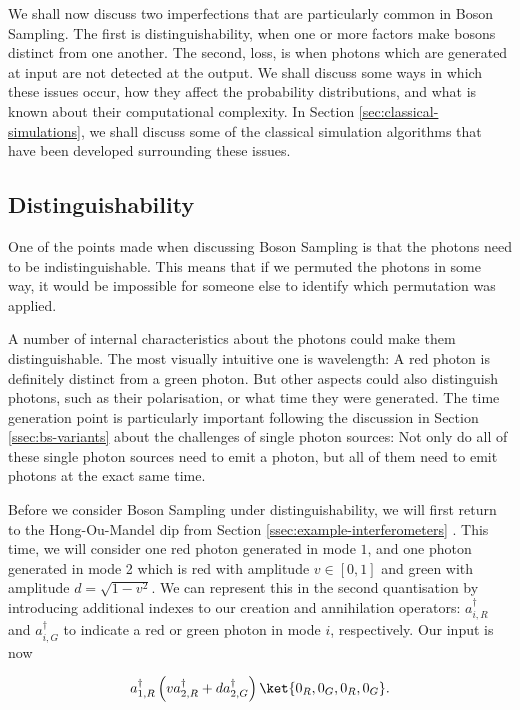 We shall now discuss two imperfections that are particularly common in Boson Sampling. The first is distinguishability, when one or more factors make bosons distinct from one another. The second, loss, is when photons which are generated at input are not detected at the output. We shall discuss some ways in which these issues occur, how they affect the probability distributions, and what is known about their computational complexity. In Section \ref{sec:classical-simulations}, we shall discuss some of the classical simulation algorithms that have been developed surrounding these issues.

\subsection{Distinguishability}
\label{ssec:imperfections-distinguishability}

One of the points made when discussing Boson Sampling is that the photons need to be indistinguishable. This means that if we permuted the photons in some way, it would be impossible for someone else to identify which permutation was applied.

A number of internal characteristics about the photons could make them distinguishable. The most visually intuitive one is wavelength: A red photon is definitely distinct from a green photon. But other aspects could also distinguish photons, such as their polarisation, or what time they were generated. The time generation point is particularly important following the discussion in Section \ref{ssec:bs-variants} about the challenges of single photon sources: Not only do all of these single photon sources need to emit a photon, but all of them need to emit photons at the exact same time.

Before we consider Boson Sampling under distinguishability, we will first return to the Hong-Ou-Mandel dip from Section \ref{ssec:example-interferometers} \cite{hong1987}. This time, we will consider one red photon generated in mode $1$, and one photon generated in mode 2 which is red with amplitude $v \in [0,1]$ and green with amplitude $d=\sqrt{1-v^2}$. We can represent this in the second quantisation by introducing additional indexes to our creation and annihilation operators: $a_{i,R}^\dagger$ and $a_{i,G}^\dagger$ to indicate a red or green photon in mode $i$, respectively. Our input is now

\begin{equation}
a_{1,R}^\dagger\left(v a_{2,R}^\dagger + da_{2,G}^\dagger\right)\ket{0_R,0_G,0_R,0_G}.
\end{equation}

